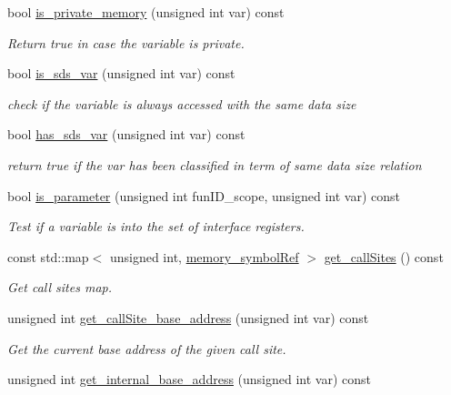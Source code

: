 \begin{DoxyCompactItemize}
bool \hyperlink{classmemory_a3f36ef4c278bf2a45a2834523c484c7f}{is\+\_\+private\+\_\+memory} (unsigned int var) const
\begin{DoxyCompactList}\small\item\em Return true in case the variable is private. \end{DoxyCompactList}\item 
bool \hyperlink{classmemory_aa55b7b58d5ccf69ab5f8a79207750079}{is\+\_\+sds\+\_\+var} (unsigned int var) const
\begin{DoxyCompactList}\small\item\em check if the variable is always accessed with the same data size \end{DoxyCompactList}\item 
bool \hyperlink{classmemory_a9d3f4a7583446c2617160ac93f7ccb27}{has\+\_\+sds\+\_\+var} (unsigned int var) const
\begin{DoxyCompactList}\small\item\em return true if the var has been classified in term of same data size relation \end{DoxyCompactList}\item 
bool \hyperlink{classmemory_ab5e7b68f10177f4a17cfab6d711dab49}{is\+\_\+parameter} (unsigned int fun\+I\+D\+\_\+scope, unsigned int var) const
\begin{DoxyCompactList}\small\item\em Test if a variable is into the set of interface registers. \end{DoxyCompactList}\item 
const std\+::map$<$ unsigned int, \hyperlink{memory__symbol_8hpp_af3608dbc27177447c2d777fa712cc82a}{memory\+\_\+symbol\+Ref} $>$ \hyperlink{classmemory_adcab40db7617504ad89b0d11d53c8965}{get\+\_\+call\+Sites} () const
\begin{DoxyCompactList}\small\item\em Get call sites map. \end{DoxyCompactList}\item 
unsigned int \hyperlink{classmemory_a3848f46ecf3925ab804f51e26661ae19}{get\+\_\+call\+Site\+\_\+base\+\_\+address} (unsigned int var) const
\begin{DoxyCompactList}\small\item\em Get the current base address of the given call site. \end{DoxyCompactList}\item 
unsigned int \hyperlink{classmemory_a9a124e4167f009e2f3c1b4343c42c2d0}{get\+\_\+internal\+\_\+base\+\_\+address} (unsigned int var) const

\end{DoxyCompactItemize}
